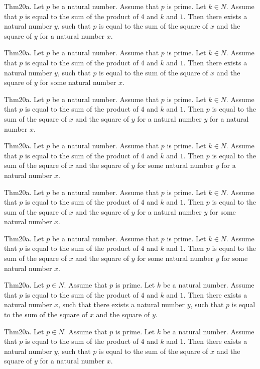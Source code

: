 \documentclass{article}
\begin{document}
Thm20a. Let $p$ be a natural number. Assume that $p$ is prime. Let $k \in N$. Assume that $p$ is equal to the sum of the product of $4$ and $k$ and $1$. Then there exists a natural number $y$, such that $p$ is equal to the sum of the square of $x$ and the square of $y$ for a natural number $x$.

Thm20a. Let $p$ be a natural number. Assume that $p$ is prime. Let $k \in N$. Assume that $p$ is equal to the sum of the product of $4$ and $k$ and $1$. Then there exists a natural number $y$, such that $p$ is equal to the sum of the square of $x$ and the square of $y$ for some natural number $x$.

Thm20a. Let $p$ be a natural number. Assume that $p$ is prime. Let $k \in N$. Assume that $p$ is equal to the sum of the product of $4$ and $k$ and $1$. Then $p$ is equal to the sum of the square of $x$ and the square of $y$ for a natural number $y$ for a natural number $x$.

Thm20a. Let $p$ be a natural number. Assume that $p$ is prime. Let $k \in N$. Assume that $p$ is equal to the sum of the product of $4$ and $k$ and $1$. Then $p$ is equal to the sum of the square of $x$ and the square of $y$ for some natural number $y$ for a natural number $x$.

Thm20a. Let $p$ be a natural number. Assume that $p$ is prime. Let $k \in N$. Assume that $p$ is equal to the sum of the product of $4$ and $k$ and $1$. Then $p$ is equal to the sum of the square of $x$ and the square of $y$ for a natural number $y$ for some natural number $x$.

Thm20a. Let $p$ be a natural number. Assume that $p$ is prime. Let $k \in N$. Assume that $p$ is equal to the sum of the product of $4$ and $k$ and $1$. Then $p$ is equal to the sum of the square of $x$ and the square of $y$ for some natural number $y$ for some natural number $x$.

Thm20a. Let $p \in N$. Assume that $p$ is prime. Let $k$ be a natural number. Assume that $p$ is equal to the sum of the product of $4$ and $k$ and $1$. Then there exists a natural number $x$, such that there exists a natural number $y$, such that $p$ is equal to the sum of the square of $x$ and the square of $y$.

Thm20a. Let $p \in N$. Assume that $p$ is prime. Let $k$ be a natural number. Assume that $p$ is equal to the sum of the product of $4$ and $k$ and $1$. Then there exists a natural number $y$, such that $p$ is equal to the sum of the square of $x$ and the square of $y$ for a natural number $x$.
\end{document}
